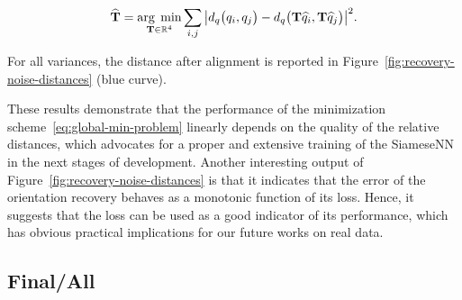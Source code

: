 \begin{equation}
    \label{eq:alignement}
    \widehat{\mathbf{T}}=\underset{\mathbf{T}\in\mathbb{R}^4}{\arg\;\min}\sum_{i,j} \big|d_q\big(q_i,q_j\big)- d_q\big(\mathbf{T}\widehat{q}_i,\mathbf{T}\widehat{q}_j\big)\big|^2.
\end{equation}

For all variances, the distance after alignment is reported in Figure~\ref{fig:recovery-noise-distances} (blue curve).

These results demonstrate that the performance of the minimization scheme~\eqref{eq:global-min-problem} linearly depends on the quality of the relative distances, which advocates for a proper and extensive training of the SiameseNN in the next stages of development. Another interesting output of Figure~\ref{fig:recovery-noise-distances} is that it indicates that the error of the orientation recovery behaves as a monotonic function of its loss. Hence, it suggests that the loss can be used as a good indicator of its performance, which has obvious practical implications for our future works on real data.

\subsection{Final/All}
